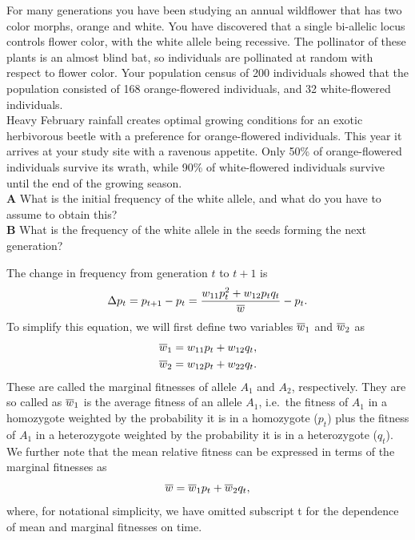 \begin{question}
For many generations you have been studying an annual wildflower that has two color morphs, orange and white. You have discovered that a single bi-allelic locus controls flower color, with the white allele being recessive. The pollinator of these plants is an almost blind bat, so individuals are pollinated at random with respect to flower color. Your population census of 200 individuals showed that the population consisted of 168 orange-flowered individuals, and 32 white-flowered individuals.\\
Heavy February rainfall creates optimal growing conditions for an
exotic herbivorous beetle with a preference for orange-flowered
individuals.  This year it arrives at your study site with a ravenous
appetite.  Only 50\% of orange-flowered individuals survive its wrath,
while 90\% of white-flowered individuals survive until the end of the
growing season.  \\
{\bf A} What is the initial frequency of the white allele, and what do you
have to assume to obtain this?\\
{\bf B} What is the frequency of the white allele in the seeds forming the next generation?\\
\end{question}


The change in frequency from generation $t$ to $t+1$ is
\begin{equation}
\Delta p_t = p_{t+1} -p_{t}= \frac{w_{11} p_t^2 + w_{12} p_tq_t}{\overline{w}} - p_t. \label{deltap_dip1}
\end{equation}
To simplify this equation, we will first define two variables $\overline{w}_1$ and $\overline{w}_2$ as
\begin{eqnarray}
	\overline{w}_1 & = w_{11} p_t + w_{12} q_t, \\
	\overline{w}_2 & =  w_{12} p_t+ w_{22} q_t.
\end{eqnarray}
These are called the marginal fitnesses of allele $A_1$
and $A_2$, respectively. They are so called as $\overline{w}_1$ is the
average fitness of an allele $A_1$, i.e.\ the fitness of $A_1$ in a
homozygote weighted by the probability it is in a homozygote ($p_t$)
plus the fitness of $A_1$ in a
heterozygote weighted by the probability it is in a heterozygote ($q_t$).
We further note that the mean relative fitness can be expressed in terms of the marginal fitnesses as
\begin{equation}
	\label{eq:meanFitInTermsOfMargFit}
	\overline{w} = \overline{w}_1 p_t + \overline{w}_2 q_t,
\end{equation}
where, for notational simplicity, we have omitted subscript t for the dependence of mean and marginal fitnesses on time.\\

